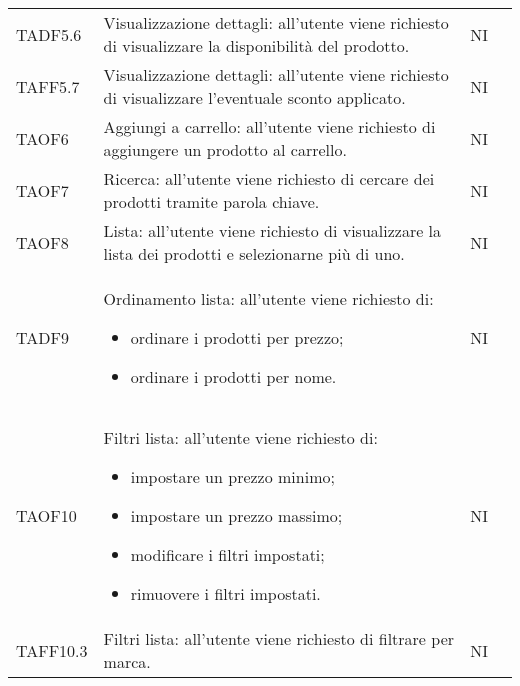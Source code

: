\begin{center}
\begin{longtable}[!h]{p{50px} p{245px} p{75px} p{50px}}
        TADF5.6                          & Visualizzazione dettagli: all'utente viene richiesto di visualizzare la disponibilità del prodotto.                                                                 & NI             \\
        TAFF5.7                          & Visualizzazione dettagli: all'utente viene richiesto di visualizzare l'eventuale sconto applicato.                                                                  & NI             \\
        TAOF6                            & Aggiungi a carrello: all'utente viene richiesto di aggiungere un prodotto al carrello.                                                                              & NI             \\
        TAOF7                            & Ricerca: all'utente viene richiesto di cercare dei prodotti tramite parola chiave.                                                                                  & NI             \\
        TAOF8                            & Lista: all'utente viene richiesto di visualizzare la lista dei prodotti e selezionarne pi\`u di uno.                                                                & NI             \\
        TADF9                            & Ordinamento lista: all'utente viene richiesto di: \begin{itemize} \item ordinare i prodotti per prezzo; \item ordinare i prodotti per nome. \end{itemize}                                                                                         & NI             \\
        TAOF10                           & Filtri lista: all'utente viene richiesto di: \begin{itemize} \item impostare un prezzo minimo; \item impostare un prezzo massimo; \item modificare i filtri impostati; \item rimuovere i filtri impostati. \end{itemize}                                                                                             & NI             \\
        TAFF10.3                         & Filtri lista: all'utente viene richiesto di filtrare per marca.                                                                                                     & NI             \\

\end{longtable}
\end{center}
